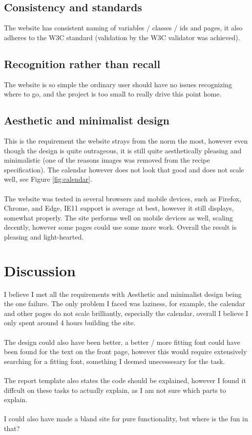 \documentclass[a4paper]{scrartcl}
\begin{document}
\subsection{Consistency and standards}
The website has consistent naming of variables / classes / ids and pages, it also
adheres to the W3C standard (validation by the W3C validator was achieved).
\subsection{Recognition rather than recall}
The website is so simple the ordinary user should have no issues recognizing where to go,
and the project is too small to really drive this point home.
\subsection{Aesthetic and minimalist design}
This is the requirement the website strays from the norm the most, however
even though the design is quite outrageous, it is still quite aesthetically pleasing and
minimalistic (one of the reasons images was removed from the recipe specification).
The calendar however does not look that good and does not scale well, see Figure \ref{fig:calendar}.
\\\\
\noindent
The website was tested in several browsers and mobile devices, such as Firefox, Chrome, and Edge,
IE11 support is average at best, however it still displays, somewhat properly.
The site performs well on mobile devices as well, scaling decently, however some
pages could use some more work.
Overall the result is pleasing and light-hearted.
\newpage
\section{Discussion}
\noindent
I believe I met all the requirements with Aesthetic and minimalist design being the one failure.
The only problem I faced was laziness, for example, the calendar and other pages do not scale
brilliantly, especially the calendar, overall I believe I only spent around 4 hours building the site.\\\\

\noindent
The design could also have been better, a better / more fitting font could have been found for the
text on the front page, however this would require extensively searching for a fitting font,
something I deemed unecessesary for the task.\\\\

\noindent
The report template also states the code should be explained, however I found it diffcult
on these tasks to actually explain, as I am not sure which parts to explain.\\\\

\noindent
I could also have made a bland site for
pure functionality, but where is the fun in that?
\end{document}
